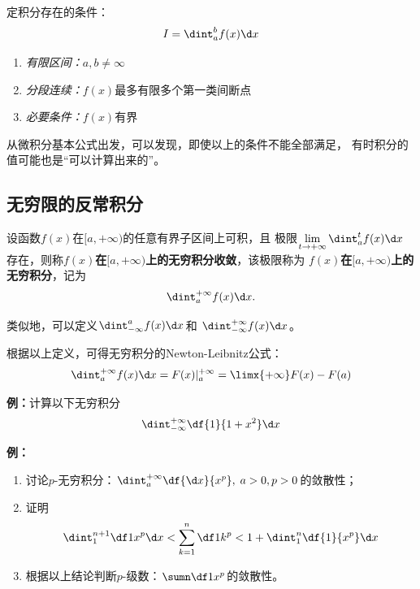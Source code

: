 定积分存在的条件：
$${I=\dint_a^bf(x)\d x}$$
\begin{enumerate} [(1)]
  \setlength{\itemindent}{1cm}
  \item {\it 有限区间：}$a,b\ne \infty$
  \item {\it 分段连续：}$f(x)$最多有限多个第一类间断点 
  \item {\it 必要条件：}$f(x)$有界
\end{enumerate}

从微积分基本公式出发，可以发现，即使以上的条件不能全部满足，
有时积分的值可能也是“可以计算出来的”。

\subsection{无穷限的反常积分}

\begin{thx}
	设函数$f(x)$在$[a,+\infty)$的任意有界子区间上可积，且
	极限$\lim\limits_{t\to+\infty}\dint_a^tf(x)\d x$
	存在，则称{\bf $f(x)$在$[a,+\infty)$上的无穷积分收敛}，该极限称为
	{\bf $f(x)$在$[a,+\infty)$上的无穷积分}，记为
	$$\dint_a^{+\infty}f(x)\d x.$$
\end{thx}
类似地，可以定义${\dint_{-\infty}^af(x)\d x}$和
${\dint_{-\infty}^{+\infty}f(x)\d x}$。

根据以上定义，可得无穷积分的Newton-Leibnitz公式：
  $$\dint_a^{+\infty}f(x)\d x=F(x)|_{a}^{+\infty}
  =\limx{+\infty}F(x)-F(a)$$
  
{\bf 例：}计算以下无穷积分
$$\dint_{-\infty}^{+\infty}\df{1}{1+x^2}\d x$$

\begin{center}
\end{center}

{\bf 例：}
\begin{enumerate}[(1)]
  \setlength{\itemindent}{1cm}
  \item 讨论{\kaishu $p$-无穷积分}：$\dint_a^{+\infty}\df{\d x}{x^p},\;a>0, p>0$的敛散性； 
  \item 证明$$\dint_1^{n+1}\df 1{x^p}\d x<\sum\limits_{k=1}^n\df 1{k^p}
  <1+\dint_1^n\df{1}{x^p}\d x$$ 
  \item 根据以上结论判断{\kaishu $p$-级数}：$\sumn\df1{x^p}$的敛散性。
\end{enumerate}

